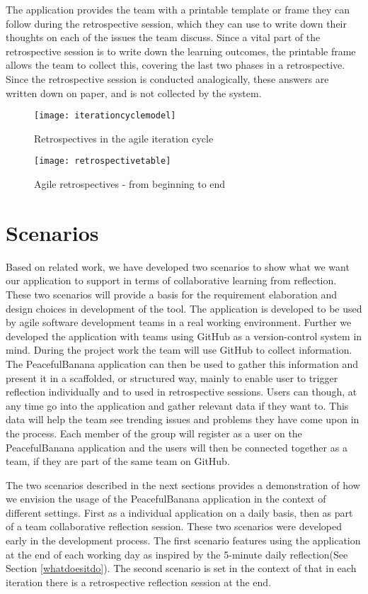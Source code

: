 The application provides the team with a printable template or frame they can follow during the retrospective session, which they can use to write down their thoughts on each of the issues the team discuss. Since a vital part of the retrospective session is to write down the learning outcomes, the printable frame allows the team to collect this, covering the last two phases in a retrospective. Since the retrospective session is conducted analogically, these answers are written down on paper, and is not collected by the system. 
\begin{figure}[!htpb]
\centering
	\texttt{[image: iterationcyclemodel]}
\caption{Retrospectives in the agile iteration cycle \citep{Derby2006}}
\label{fig:itcyclemodel}
\end{figure}
\begin{figure}[!htpb]
\centering
	\texttt{[image: retrospectivetable]}
\caption{Agile retrospectives - from beginning to end \citep{Derby2006}}
\label{fig:retrospectivetable}
\end{figure}

\section{Scenarios}
\label{sec:scenarios}
Based on related work, we have developed two scenarios to show what we want our application to support in terms of collaborative learning from reflection. These two scenarios will provide a basis for the requirement elaboration and design choices in development of the tool. 
The application is developed to be used by agile software development teams in a real working environment. Further we developed the application with teams using GitHub as a version-control system in mind. During the project work the team will use GitHub to collect information. The PeacefulBanana application can then be used to gather this information and present it in a scaffolded, or structured way, mainly to enable user to trigger reflection individually and to used in retrospective sessions. Users can though, at any time go into the application and gather relevant data if they want to. This data will help the team see trending issues and problems they have come upon in the process. Each member of the group will register as a user on the PeacefulBanana application and the users will then be connected together as a team, if they are part of the same team on GitHub. 

The two scenarios described in the next sections provides a demonstration of how we envision the usage of the PeacefulBanana application in the context of different settings. First as a individual application on a daily basis, then as part of a team collaborative reflection session.
These two scenarios were developed early in the development process. The first scenario features using the application at the end of each working day as inspired by the 5-minute daily reflection(See Section \ref{whatdoesitdo}). The second scenario is set in the context of that in each iteration there is a retrospective reflection session at the end. 

